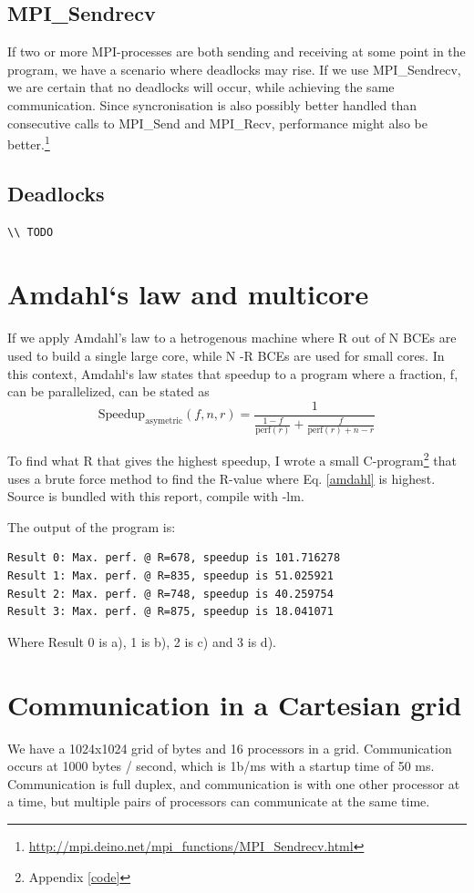 \documentclass[english,a4paper,numbers=noenddot]{scrartcl}
\begin{document}
\subsection{MPI\_Sendrecv}
If two or more MPI-processes are both sending and receiving at some point in the program, we have a scenario where deadlocks may rise. If we use MPI\_Sendrecv, we are certain that no deadlocks will occur, while achieving the same communication. Since syncronisation is also possibly better handled than consecutive calls to MPI\_Send and MPI\_Recv, performance might also be better.\footnote{\url{http://mpi.deino.net/mpi_functions/MPI_Sendrecv.html}}

\subsection{Deadlocks}
\begin{lstlisting}
\\ TODO
\end{lstlisting}

\section{Amdahl`s law and multicore}
If we apply Amdahl's law to a hetrogenous machine where R out of N BCEs are used to build a single large core, while N -R BCEs are used for small cores. In this context, Amdahl`s law states that speedup to a program where a fraction, f, can be parallelized, can be stated as
\begin{equation}
    \label{amdahl}
    \text{Speedup}_{\text{asymetric}} (f,n,r)= \frac{1}{\frac{1-f}{\text{perf}(r)} + \frac{f}{\text{perf}(r) + n - r}}
\end{equation}

To find what R that gives the highest speedup, I wrote a small C-program\footnote{Appendix \ref{code}} that uses a brute force method to find the R-value where Eq. \eqref{amdahl} is highest. Source is bundled with this report, compile with -lm.

The output of the program is:
\begin{lstlisting}
Result 0: Max. perf. @ R=678, speedup is 101.716278
Result 1: Max. perf. @ R=835, speedup is 51.025921
Result 2: Max. perf. @ R=748, speedup is 40.259754
Result 3: Max. perf. @ R=875, speedup is 18.041071
\end{lstlisting}
Where Result 0 is a), 1 is b), 2 is c) and 3 is d).

\newpage
\section{Communication in a Cartesian grid}
We have a 1024x1024 grid of bytes and 16 processors in a grid. Communication occurs at 1000 bytes / second, which is 1b/ms  with a startup time of 50 ms. Communication is full duplex, and communication is with one other processor at a time, but multiple pairs of processors can communicate at the same time.
\end{document}
